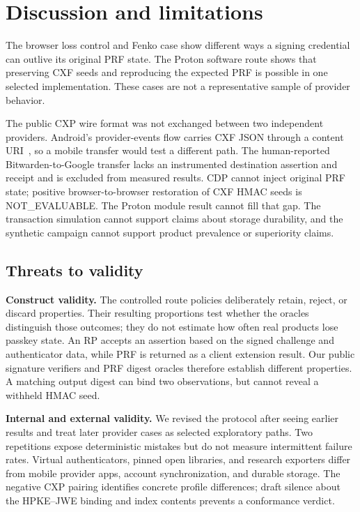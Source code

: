 \documentclass[letterpaper,twocolumn,10pt]{article}
\begin{document}
\section{Discussion and limitations}
The browser loss control and Fenko case show different ways a signing
credential can outlive its original PRF state. The Proton software route
shows that preserving CXF seeds and reproducing the expected PRF is
possible in one selected implementation. These cases are not a
representative sample of provider behavior.

The public CXP wire format was not exchanged between two independent
providers. Android's provider-events flow carries CXF JSON through a
content URI~\cite{androidtransfer}, so a mobile transfer would test a
different path. The human-reported Bitwarden-to-Google transfer lacks an
instrumented destination assertion and receipt and is excluded from
measured results. CDP cannot inject original PRF state; positive
browser-to-browser restoration of CXF HMAC seeds is NOT\_EVALUABLE. The
Proton module result cannot fill that gap. The transaction simulation
cannot support claims about storage durability, and the synthetic campaign
cannot support product prevalence or superiority claims.

\subsection{Threats to validity}
\textbf{Construct validity.} The controlled route policies deliberately
retain, reject, or discard properties. Their resulting proportions test
whether the oracles distinguish those outcomes; they do not estimate how
often real products lose passkey state. An RP accepts an assertion based on
the signed challenge and authenticator data, while PRF is returned as a
client extension result. Our public signature verifiers and PRF digest
oracles therefore establish different properties. A matching output digest
can bind two observations, but cannot reveal a withheld HMAC seed.

\textbf{Internal and external validity.} We revised the protocol after
seeing earlier results and treat later provider cases as selected
exploratory paths. Two repetitions expose deterministic mistakes but do
not measure intermittent failure rates. Virtual authenticators, pinned
open libraries, and research exporters differ from mobile provider apps,
account synchronization, and durable storage. The negative CXP pairing
identifies concrete profile differences; draft silence about the
HPKE--JWE binding and index contents prevents a conformance verdict.
\end{document}
